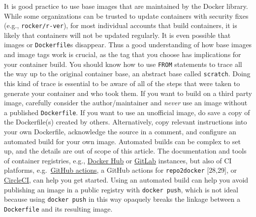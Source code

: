 \documentclass[10pt,letterpaper]{article}
\begin{document}
It is good practice to use base images that are maintained by the Docker
library. While some organizations can be trusted to update containers
with security fixes (e.g., \texttt{rocker/r-ver}), for most individual
accounts that build containers, it is likely that containers will not be
updated regularly. It is even possible that images or
\texttt{Dockerfile}s disappear. Thus a good understanding of how base
images and image tags work is crucial, as the tag that you choose has
implications for your container build. You should know how to use
\texttt{FROM} statements to trace all the way up to the original
container base, an abstract base called \texttt{scratch}. Doing this
kind of trace is essential to be aware of all of the steps that were
taken to generate your container and who took them. If you want to build
on a third party image, carefully consider the author/maintainer and
\emph{never} use an image without a published \texttt{Dockerfile}. If
you want to use an unofficial image, do save a copy of the Dockerfile(s)
created by others. Alternatively, copy relevant instructions into your
own Dockerfile, acknowledge the source in a comment, and configure an
automated build for your own image. Automated builds can be complex to
set up, and the details are out of scope of this article. The
documentation and tools of container registries, e.g.,
\href{https://docs.docker.com/docker-hub/builds/}{Docker Hub} or
\href{https://docs.gitlab.com/ee/user/packages/container_registry/index.html\#build-and-push-images}{GitLab}
instances, but also of CI platforms,
e.g.~\href{https://github.com/actions/starter-workflows/tree/master/ci}{GitHub
actions}, a GitHub actions for \texttt{repo2docker} {[}28,29{]}, or
\href{https://circleci.com/orbs/registry/orb/circleci/docker\#commands-build}{CircleCI},
can help you get started. Using an automated build can help you avoid
publishing an image in a public registry with \texttt{docker\ push},
which is not ideal because using \texttt{docker\ push} in this way
opaquely breaks the linkage between a \texttt{Dockerfile} and its
resulting image.
\end{document}
